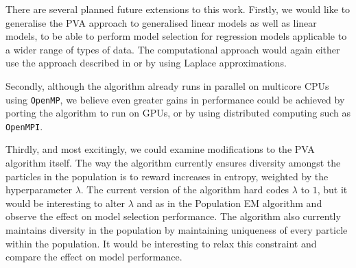 There are several planned future extensions to this work. Firstly, we would
like to generalise the PVA approach to generalised linear models as well as
linear models, to be able to perform model selection for regression models
applicable to a wider range of types of data. The computational approach would
again either use the approach described in \cite{Li2015} or by using Laplace
approximations.  

Secondly, although the algorithm already runs in parallel on multicore CPUs
using \texttt{OpenMP}, we believe even greater gains in performance could be
achieved by porting the algorithm to run on GPUs, or by using distributed
computing such as \texttt{OpenMPI}.

Thirdly, and most excitingly, we could examine modifications to the PVA
algorithm itself. The way the algorithm currently ensures diversity amongst the
particles in the population is to reward increases in entropy, weighted by the
hyperparameter $\lambda$. The current version of the algorithm hard codes
$\lambda$ to $1$, but it would be interesting to alter $\lambda$ and as in the
Population EM algorithm \cite{Tan2018} and observe the effect on model
selection performance. The algorithm also currently maintains diversity in the
population by maintaining uniqueness of every particle within the population.
It would be interesting to relax this constraint and compare the effect on
model performance.
